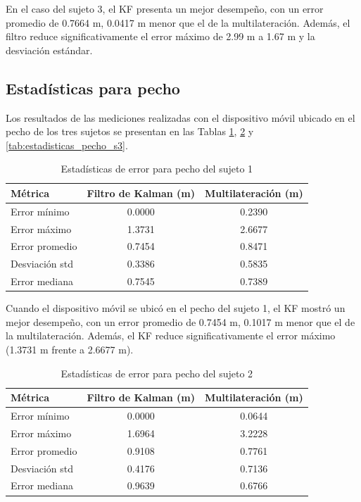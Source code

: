 %
En el caso del sujeto 3, el KF presenta un mejor desempeño, con un error promedio de 0.7664 m, 0.0417 m menor que el de la multilateración. Además, el filtro reduce significativamente el error máximo de 2.99 m a 1.67 m y la desviación estándar.

\subsection{Estadísticas para pecho}

Los resultados de las mediciones realizadas con el dispositivo móvil ubicado en el pecho de los tres sujetos se presentan en las Tablas \ref{tab:estadisticas_pecho_s1}, \ref{tab:estadisticas_pecho_s2} y \ref{tab:estadisticas_pecho_s3}.
%
\begin{table}[t]
\centering
\caption{Estadísticas de error para pecho del sujeto 1}
\label{tab:estadisticas_pecho_s1}
\begin{tabular}{lcc}
\hline
\rowcolor{headerblue}
\textbf{Métrica} & \textbf{Filtro de Kalman (m)} & \textbf{Multilateración (m)} \\
\hline
Error mínimo & 0.0000 & 0.2390 \\
Error máximo & 1.3731 & 2.6677 \\
Error promedio & 0.7454 & 0.8471 \\
Desviación std & 0.3386 & 0.5835 \\
Error mediana & 0.7545 & 0.7389 \\
\hline
\end{tabular}
\end{table}
%
Cuando el dispositivo móvil se ubicó en el pecho del sujeto 1, el KF mostró un mejor desempeño, con un error promedio de 0.7454 m, 0.1017 m menor que el de la multilateración. Además, el KF reduce significativamente el error máximo (1.3731 m frente a 2.6677 m). 
%
\begin{table}[t]
\centering
\caption{Estadísticas de error para pecho del sujeto 2}
\label{tab:estadisticas_pecho_s2}
\begin{tabular}{lcc}
\hline
\rowcolor{headerblue}
\textbf{Métrica} & \textbf{Filtro de Kalman (m)} & \textbf{Multilateración (m)} \\
\hline
Error mínimo & 0.0000 & 0.0644 \\
Error máximo & 1.6964 & 3.2228 \\
Error promedio & 0.9108 & 0.7761 \\
Desviación std & 0.4176 & 0.7136 \\
Error mediana & 0.9639 & 0.6766 \\
\hline
\end{tabular}
\end{table}
